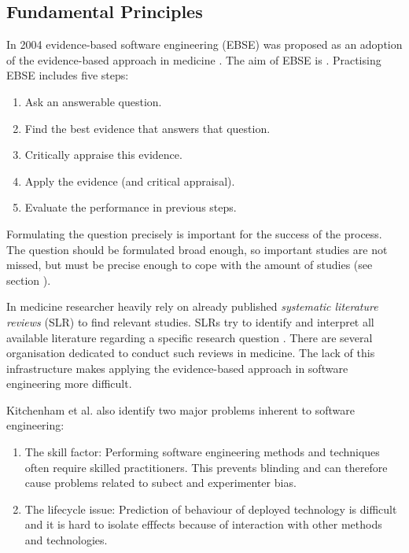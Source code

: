 \subsection{Fundamental Principles}

\newline
In 2004 evidence-based software engineering (EBSE) was proposed as an adoption of the evidence-based approach in medicine \cite{EBSE}. The aim of EBSE is  \cite{Dyba2005}. Practising EBSE includes five steps:
\begin{enumerate}
	\item Ask an answerable question.
	\item Find the best evidence that answers that question.
	\item Critically appraise this evidence.
	\item Apply the evidence (and critical appraisal).
	\item Evaluate the performance in previous steps.
\end{enumerate}
Formulating the question precisely is important for the success of the process. The question should be formulated broad enough, so important studies are not missed, but must be precise enough to cope with the amount of studies (see section ).

In medicine researcher heavily rely on already published \emph{systematic literature reviews} (SLR) to find relevant studies. SLRs try to identify and interpret all available literature regarding a specific research question \cite{keele2007}. There are several organisation dedicated to conduct such reviews in medicine. The lack of this infrastructure makes applying the evidence-based approach in software engineering more difficult.

Kitchenham et al. \cite{EBSE} also identify two major problems inherent to software engineering:
\begin{enumerate}
\item The skill factor: Performing software engineering methods and techniques often require skilled practitioners. This prevents blinding and can therefore cause problems related to subect and experimenter bias.
\item The lifecycle issue: Prediction of behaviour  of deployed technology is difficult and it is hard to isolate efffects because of interaction with other methods and technologies.
\end{enumerate}

